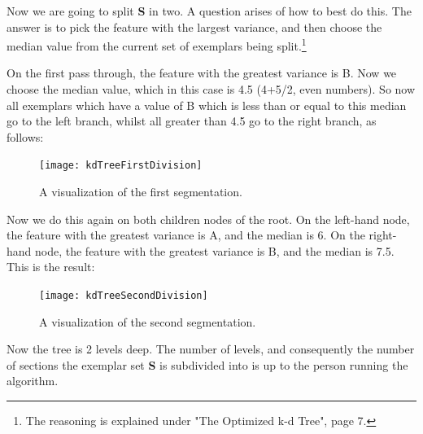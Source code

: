 \documentclass[a4paper, 12pt]{article}
\begin{document}
                    \par Now we are going to split \textbf{S} in two. A question arises of how to best do this. The answer is to pick the feature with the largest variance, and then choose the median value from the current set of exemplars being split.\cite{kNearestNeighbours}\footnote{The reasoning is explained under "The Optimized k-d Tree", page 7.}
                    
                    \newpage
                    
                    \par On the first pass through, the feature with the greatest variance is B. Now we choose the median value, which in this case is 4.5 (4+5/2, even numbers). So now all exemplars which have a value of B which is less than or equal to this median go to the left branch, whilst all greater than 4.5 go to the right branch, as follows:
                    
                    \begin{figure}[h]
                        \caption{A visualization of the first segmentation.}
                        \centering
                        \texttt{[image: kdTreeFirstDivision]}
                    \end{figure}
                    
                    \newpage
                    
                    \par Now we do this again on both children nodes of the root. On the left-hand node, the feature with the greatest variance is A, and the median is 6. On the right-hand node, the feature with the greatest variance is B, and the median is 7.5. This is the result:
                    
                    \begin{figure}[h]
                        \caption{A visualization of the second segmentation.}
                        \centering
                        \texttt{[image: kdTreeSecondDivision]}
                    \end{figure}
                    
                    \newpage
                    
                    \par Now the tree is 2 levels deep. The number of levels, and consequently the number of sections the exemplar set \textbf{S} is subdivided into is up to the person running the algorithm.
                  
\end{document}
